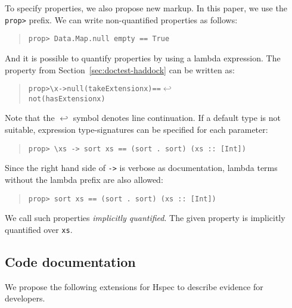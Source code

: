 \documentclass[preprint]{sigplanconf}
\begin{document}
\noindent To specify properties, we also propose new markup. In this paper, we
use the {\tt prop>} prefix. We can write non-quantified properties as follows:

\begin{quote}
\small
\begin{verbatim}
prop> Data.Map.null empty == True
\end{verbatim}
\end{quote}

\noindent And it is possible to quantify properties by using a
lambda expression. The property from Section~\ref{sec:doctest-haddock}
can be written as:

\begin{quote}
\small
\begin{alltt}
prop> \verb|\|x -> null (takeExtension x) == \(\hookleftarrow\)
            not (hasExtension x)
\end{alltt}
\end{quote}

\noindent Note that the $\hookleftarrow$ symbol denotes line
continuation.
If a default type is not suitable, expression type-signatures can be
specified for each parameter:

\begin{quote}
\small
\begin{verbatim}
prop> \xs -> sort xs == (sort . sort) (xs :: [Int])
\end{verbatim}
\end{quote}

\noindent Since the right hand side of {\tt ->} is verbose as documentation,
lambda terms without the lambda prefix are also allowed:

\begin{quote}
\small
\begin{verbatim}
prop> sort xs == (sort . sort) (xs :: [Int])
\end{verbatim}
\end{quote}

\noindent We call such properties \emph{implicitly quantified}.  The
given property is implicitly quantified over \verb|xs|.

\subsection{Code documentation}
\label{sec:code-doc}

We propose the following extensions for Hspec to
describe evidence for developers.
\end{document}
